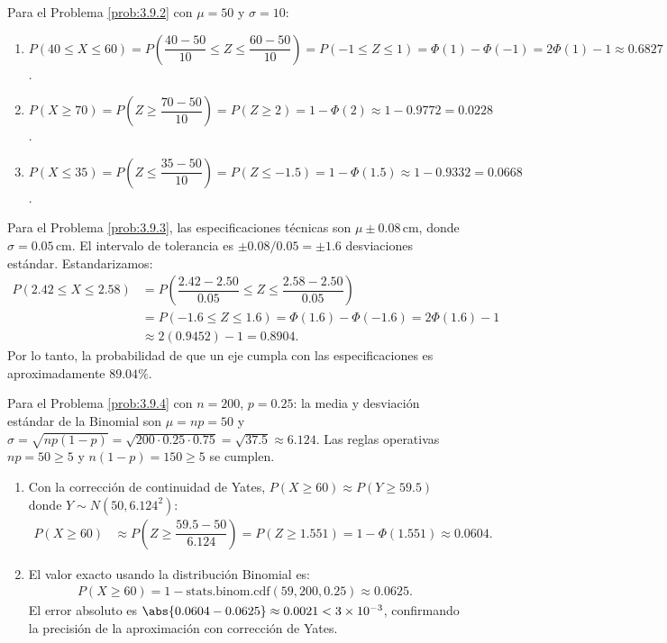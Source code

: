 \begin{solucion}
	\label{sol:3.9.2}
	Para el Problema \ref{prob:3.9.2} con $\mu = 50$ y $\sigma = 10$:
	\begin{enumerate}
		\item $P(40 \le X \le 60) = P\left(\dfrac{40-50}{10} \le Z \le \dfrac{60-50}{10}\right) = P(-1 \le Z \le 1) = \Phi(1) - \Phi(-1) = 2\Phi(1) - 1 \approx 0.6827$.
		\item $P(X \ge 70) = P\left(Z \ge \dfrac{70-50}{10}\right) = P(Z \ge 2) = 1 - \Phi(2) \approx 1 - 0.9772 = 0.0228$.
		\item $P(X \le 35) = P\left(Z \le \dfrac{35-50}{10}\right) = P(Z \le -1.5) = 1 - \Phi(1.5) \approx 1 - 0.9332 = 0.0668$.
	\end{enumerate}
\end{solucion}

\begin{solucion}
	\label{sol:3.9.3}
	Para el Problema \ref{prob:3.9.3}, las especificaciones técnicas son $\mu \pm 0.08\,\text{cm}$, donde $\sigma = 0.05\,\text{cm}$. El intervalo de tolerancia es $\pm 0.08/0.05 = \pm 1.6$ desviaciones estándar. Estandarizamos:
	\begin{align*}
		P(2.42 \le X \le 2.58) &= P\left(\dfrac{2.42 - 2.50}{0.05} \le Z \le \dfrac{2.58 - 2.50}{0.05}\right) \\
		&= P(-1.6 \le Z \le 1.6) = \Phi(1.6) - \Phi(-1.6) = 2\Phi(1.6) - 1 \\
		&\approx 2(0.9452) - 1 = 0.8904.
	\end{align*}
	Por lo tanto, la probabilidad de que un eje cumpla con las especificaciones es aproximadamente $89.04\%$.
\end{solucion}

\begin{solucion}
	\label{sol:3.9.4}
	Para el Problema \ref{prob:3.9.4} con $n = 200$, $p = 0.25$: la media y desviación estándar de la Binomial son $\mu = np = 50$ y $\sigma = \sqrt{np(1-p)} = \sqrt{200 \cdot 0.25 \cdot 0.75} = \sqrt{37.5} \approx 6.124$. Las reglas operativas $np = 50 \ge 5$ y $n(1-p) = 150 \ge 5$ se cumplen.
	\begin{enumerate}
		\item Con la corrección de continuidad de Yates, $P(X \ge 60) \approx P(Y \ge 59.5)$ donde $Y \sim N(50, 6.124^{2})$:
		\begin{align*}
			P(X \ge 60) &\approx P\left(Z \ge \dfrac{59.5 - 50}{6.124}\right) = P(Z \ge 1.551) = 1 - \Phi(1.551) \approx 0.0604.
		\end{align*}
		\item El valor exacto usando la distribución Binomial es:
		\begin{align*}
			P(X \ge 60) = 1 - \text{stats.binom.cdf}(59, 200, 0.25) \approx 0.0625.
		\end{align*}
		El error absoluto es $\abs{0.0604 - 0.0625} \approx 0.0021 < 3 \times 10^{-3}$, confirmando la precisión de la aproximación con corrección de Yates.
	\end{enumerate}
\end{solucion}

